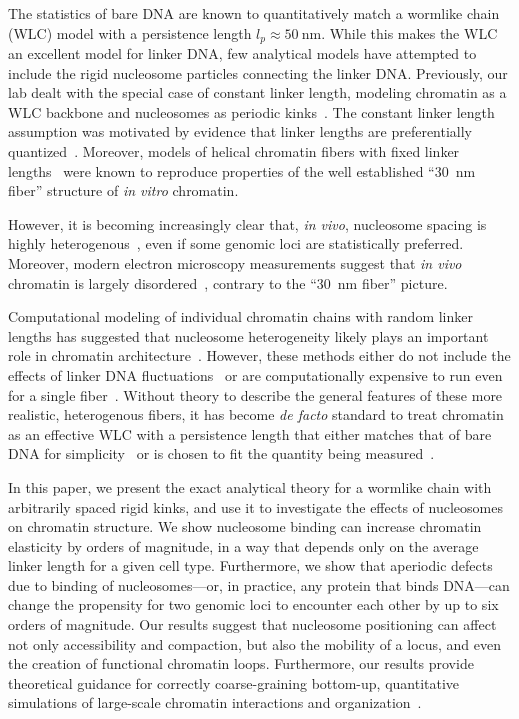 \documentclass[%
 reprint,
superscriptaddress,
showpacs,preprintnumbers,
 amsmath,amssymb,
 aps,
 prl,
]{revtex4-1}
\begin{document}
The statistics of bare DNA are known to quantitatively match a wormlike
    chain (WLC) model with a persistence length {$l_p \approx
    \SI{50}{\nano\metre}$}.
While this makes the WLC an excellent model for linker DNA, few analytical
    models have attempted to include the rigid nucleosome particles connecting
    the linker DNA\@.
Previously, our lab dealt with the special case of constant linker length,
    modeling chromatin as a WLC backbone and nucleosomes as periodic
    kinks~\cite{koslover2013}.
The constant linker length assumption was motivated by evidence
    that linker lengths are preferentially quantized~\cite{widom1992,wang2008a}.
Moreover, models of helical chromatin fibers with fixed linker
    lengths~\cite{wedemann2002} were known to reproduce properties of the well
    established ``\SI{30}{\nano\metre} fiber'' structure of \textit{in vitro}
    chromatin.

However, it is becoming increasingly clear that, \textit{in vivo}, nucleosome
    spacing is highly
    heterogenous~\cite{lai2018,chereji2018,beshnova2014},
    even if some genomic loci are statistically preferred.
Moreover, modern electron microscopy measurements suggest that \textit{in vivo}
    chromatin is largely disordered~\cite{ou2017}, contrary to the
    ``\SI{30}{\nano\metre} fiber'' picture.

Computational modeling of individual chromatin chains with random
    linker lengths has suggested that nucleosome heterogeneity likely plays an
    important role in chromatin
    architecture~\cite{woodcock1993,collepardo-guevara2014}.
However, these methods either do not include the effects of linker
    DNA fluctuations~\cite{woodcock1993} or are computationally expensive to run
    even for a single fiber~\cite{collepardo-guevara2014}.
Without theory to describe the general features of these more realistic,
    heterogenous fibers, it has become \textit{de facto} standard to treat
    chromatin as an effective WLC with a persistence length that either matches
    that of bare DNA for
    simplicity~\cite{benedetti2017,macphersonInPress,nuebler2018} or is chosen
    to fit the quantity being measured~\cite{sanborn2015,pierro2017}.

In this paper, we present the exact analytical theory for a wormlike chain
    with arbitrarily spaced rigid kinks, and use it to investigate the effects
    of nucleosomes on chromatin structure.
We show nucleosome binding can increase chromatin elasticity by orders of
    magnitude, in a way that depends only on the average linker length for a
    given cell type.
Furthermore, we show that aperiodic defects due to binding of nucleosomes---or, in
    practice, any protein that binds DNA---can change the
    propensity for two genomic loci to encounter each other by up to six
    orders of magnitude.
Our results suggest that nucleosome positioning can affect not only
    accessibility and compaction, but also the mobility of a locus, and even
    the creation of functional chromatin loops.
Furthermore, our results provide theoretical guidance for correctly
    coarse-graining bottom-up, quantitative simulations of large-scale chromatin
    interactions and organization~\cite{macphersonInPress}.
\end{document}
